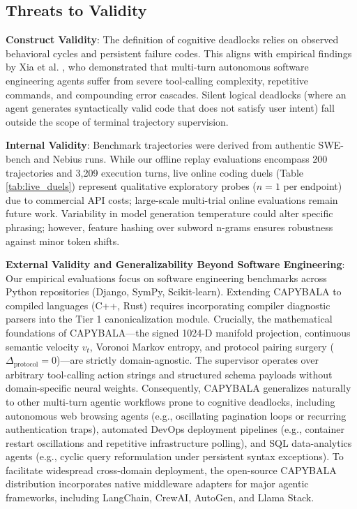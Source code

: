 \documentclass[journal]{IEEEtran}
\begin{document}
\subsection{Threats to Validity}
\textbf{Construct Validity}: The definition of cognitive deadlocks relies on observed behavioral cycles and persistent failure codes. This aligns with empirical findings by Xia et al. \cite{xia2025demystifying}, who demonstrated that multi-turn autonomous software engineering agents suffer from severe tool-calling complexity, repetitive commands, and compounding error cascades. Silent logical deadlocks (where an agent generates syntactically valid code that does not satisfy user intent) fall outside the scope of terminal trajectory supervision.

\textbf{Internal Validity}: Benchmark trajectories were derived from authentic SWE-bench and Nebius runs. While our offline replay evaluations encompass 200 trajectories and 3,209 execution turns, live online coding duels (Table \ref{tab:live_duels}) represent qualitative exploratory probes ($n=1$ per endpoint) due to commercial API costs; large-scale multi-trial online evaluations remain future work. Variability in model generation temperature could alter specific phrasing; however, feature hashing over subword n-grams ensures robustness against minor token shifts.

\textbf{External Validity and Generalizability Beyond Software Engineering}: Our empirical evaluations focus on software engineering benchmarks across Python repositories (Django, SymPy, Scikit-learn). Extending CAPYBALA to compiled languages (C++, Rust) requires incorporating compiler diagnostic parsers into the Tier 1 canonicalization module. Crucially, the mathematical foundations of CAPYBALA---the signed 1024-D manifold projection, continuous semantic velocity $v_t$, Voronoi Markov entropy, and protocol pairing surgery ($\Delta_{\text{protocol}} = 0$)---are strictly domain-agnostic. The supervisor operates over arbitrary tool-calling action strings and structured schema payloads without domain-specific neural weights. Consequently, CAPYBALA generalizes naturally to other multi-turn agentic workflows prone to cognitive deadlocks, including autonomous web browsing agents (e.g., oscillating pagination loops or recurring authentication traps), automated DevOps deployment pipelines (e.g., container restart oscillations and repetitive infrastructure polling), and SQL data-analytics agents (e.g., cyclic query reformulation under persistent syntax exceptions). To facilitate widespread cross-domain deployment, the open-source CAPYBALA distribution incorporates native middleware adapters for major agentic frameworks, including LangChain, CrewAI, AutoGen, and Llama Stack.
\end{document}
